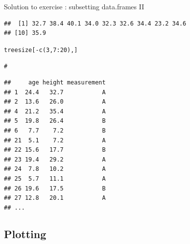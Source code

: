 \documentclass[xcolor=table,           xcolor=dvipsnames]{beamer}\usepackage[]{graphicx}\usepackage[]{color}
\makeatletter
\newcommand{\hlnum}[1]{\textcolor[rgb]{0,0,0}{#1}}
\newcommand{\hlcom}[1]{\textcolor[rgb]{0,0.392,0}{\textit{#1}}}
\newcommand{\hlopt}[1]{\textcolor[rgb]{0,0,0}{#1}}
\newcommand{\hlstd}[1]{\textcolor[rgb]{0,0,0}{#1}}
\newcommand{\hlkwd}[1]{\textcolor[rgb]{0,0,1}{#1}}
\newenvironment{kframe}{%
 \def\at@end@of@kframe{}%
 \ifinner\ifhmode%
  \def\at@end@of@kframe{\end{minipage}}%
  \begin{minipage}{\columnwidth}%
 \fi\fi%
 \def\FrameCommand##1{\hskip\@totalleftmargin \hskip-\fboxsep
 \colorbox{shadecolor}{##1}\hskip-\fboxsep
     \hskip-\linewidth \hskip-\@totalleftmargin \hskip\columnwidth}%
 \MakeFramed {\advance\hsize-\width
   \@totalleftmargin\z@ \linewidth\hsize
   \@setminipage}}%
 {\par\unskip\endMakeFramed%
 \at@end@of@kframe}
\newenvironment{knitrout}{}{} %
\newcounter{exercisecount}
\makeatother
\begin{document}
\begin{frame}[fragile]{Solution to exercise : subsetting data.frames II}
\begin{knitrout}\scriptsize
{}\color{fgcolor}\begin{kframe}
\begin{verbatim}
##  [1] 32.7 38.4 40.1 34.0 32.3 32.6 34.4 23.2 34.6
## [10] 35.9
\end{verbatim}
\end{kframe}
\end{knitrout}
\begin{knitrout}\scriptsize
{}\color{fgcolor}\begin{kframe}
\begin{alltt}
\hlstd{treesize[} \hlopt{-}\hlkwd{c}\hlstd{(}\hlnum{3}\hlstd{,}\hlnum{7}\hlopt{:}\hlnum{20}\hlstd{) , ]}

\hlcom{#}
\end{alltt}
\end{kframe}
\end{knitrout}
\vspace{-3em}
\begin{knitrout}\scriptsize
{}\color{fgcolor}\begin{kframe}
\begin{verbatim}
##     age height measurement
## 1  24.4   32.7           A
## 2  13.6   26.0           A
## 4  21.2   35.4           A
## 5  19.8   26.4           B
## 6   7.7    7.2           B
## 21  5.1    7.2           A
## 22 15.6   17.7           B
## 23 19.4   29.2           A
## 24  7.8   10.2           A
## 25  5.7   11.1           A
## 26 19.6   17.5           B
## 27 12.8   20.1           A
## ...
\end{verbatim}
\end{kframe}
\end{knitrout}
\end{frame}

\subsection{Plotting}
\end{document}
